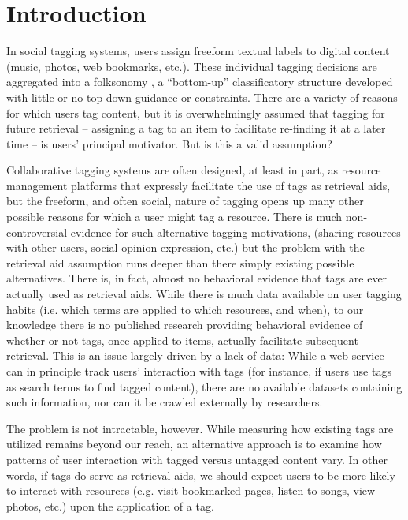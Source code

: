 \section{Introduction}
\label{sec_intro}

In social tagging systems, users assign freeform textual labels to digital content (music, photos, web bookmarks, etc.). These individual tagging decisions are aggregated into a folksonomy \cite{VanderWal2007}, a ``bottom-up'' classificatory structure developed with little or no top-down guidance or constraints. There are a variety of reasons for which users tag content, but it is overwhelmingly assumed that tagging for future retrieval -- assigning a tag to an item to facilitate re-finding it at a later time -- is users' principal motivator. But is this a valid assumption?

Collaborative tagging systems are often designed, at least in part, as resource management platforms that expressly facilitate the use of tags as retrieval aids, but the freeform, and often social, nature of tagging opens up many other possible reasons for which a user might tag a resource. There is much non-controversial evidence for such alternative tagging motivations, (sharing resources with other users, social opinion expression, etc.) but the problem with the retrieval aid assumption runs deeper than there simply existing possible alternatives. There is, in fact, almost no behavioral evidence that tags are ever actually used as retrieval aids. While there is much data available on user tagging habits (i.e. which terms are applied to which resources, and when), to our knowledge there is no published research providing behavioral evidence of whether or not tags, once applied to items, actually facilitate subsequent retrieval. This is an issue largely driven by a lack of data: While a web service can in principle track users' interaction with tags (for instance, if users use tags as search terms to find tagged content), there are no available datasets containing such information, nor can it be crawled externally by researchers.

The problem is not intractable, however. While measuring how existing tags are utilized remains beyond our reach, an alternative approach is to examine how patterns of user interaction with tagged versus untagged content vary. In other words, if tags do serve as retrieval aids, we should expect users to be more likely to interact with resources (e.g. visit bookmarked pages, listen to songs, view photos, etc.) upon the application of a tag.

